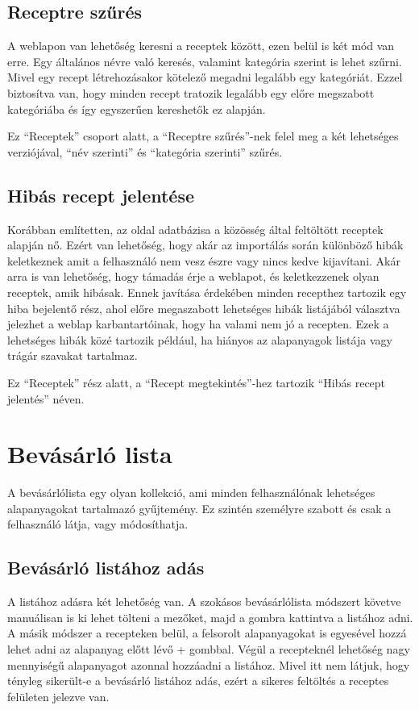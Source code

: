 \documentclass[12pt]{report}
\theoremstyle{definition}
\begin{document}
\subsection{Receptre szűrés}
A weblapon van lehetőség keresni a receptek között, ezen belül is két mód van erre. Egy általános névre való keresés, valamint kategória szerint is lehet szűrni. Mivel egy recept létrehozásakor kötelező megadni legalább egy kategóriát. Ezzel biztosítva van, hogy minden recept tratozik legalább egy előre megszabott kategóriába és így egyszerűen kereshetők ez alapján.

 Ez  “Receptek” csoport alatt, a “Receptre szűrés”-nek felel meg a két lehetséges verziójával, “név szerinti” és “kategória szerinti” szűrés.

\subsection{Hibás recept jelentése}
Korábban említetten, az oldal adatbázisa a közösség által feltöltött receptek alapján nő. Ezért van lehetőség, hogy akár az importálás során különböző hibák keletkeznek amit a felhasználó nem vesz észre vagy nincs kedve kijavítani. Akár arra is van lehetőség, hogy támadás érje a weblapot, és keletkezzenek olyan receptek, amik hibásak. Ennek javítása érdekében minden recepthez tartozik egy hiba bejelentő rész, ahol előre megaszabott lehetséges hibák listájából választva jelezhet a weblap karbantartóinak, hogy ha valami nem jó a recepten. Ezek a lehetséges hibák közé tartozik például, ha hiányos az alapanyagok listája vagy trágár szavakat tartalmaz.

Ez  “Receptek” rész alatt, a “Recept megtekintés”-hez tartozik “Hibás recept jelentés” néven.

\section{Bevásárló lista}
A bevásárlólista egy olyan kollekció, ami minden felhasználónak lehetséges alapanyagokat tartalmazó gyűjtemény. Ez szintén személyre szabott és csak a felhasználó látja, vagy módosíthatja.

\subsection{Bevásárló listához adás}
A listához adásra két lehetőség van. A szokásos bevásárlólista módszert követve manuálisan is ki lehet tölteni a mezőket, majd a gombra kattintva a listához adni. A másik módszer a recepteken belül, a felsorolt alapanyagokat is egyesével hozzá lehet adni az alapanyag előtt lévő + gombbal. Végül a recepteknél lehetőség nagy mennyiségű alapanyagot azonnal hozzáadni a listához. Mivel itt nem látjuk, hogy tényleg sikerült-e a bevásárló listához adás, ezért a sikeres feltöltés a receptes felületen jelezve van.
\end{document}
